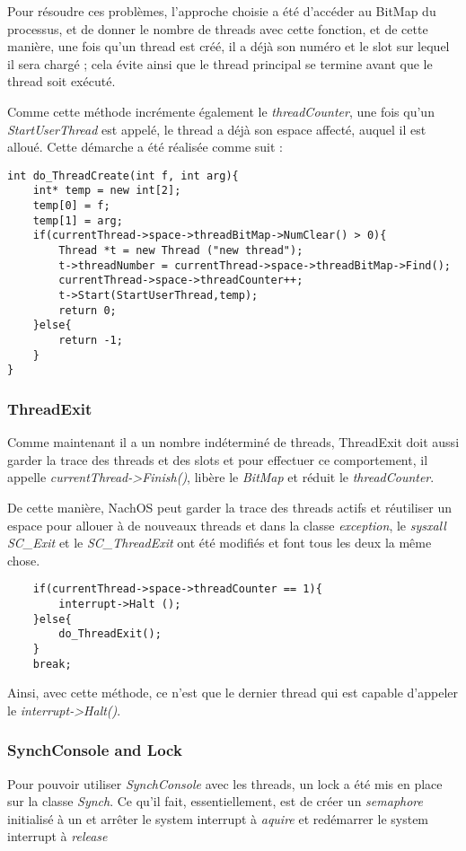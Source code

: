 \documentclass{article}
\begin{document}
Pour résoudre ces problèmes, l'approche choisie a été d'accéder au BitMap du processus, et de donner le nombre de threads avec cette fonction, et de cette manière, une fois qu'un thread est créé, il a déjà son numéro et le slot sur lequel il sera chargé ; cela évite ainsi que le thread principal se termine avant que le thread soit exécuté. 
\newline

Comme cette méthode incrémente également le \textit{threadCounter}, une fois qu'un \textit{StartUserThread} est appelé, le thread a déjà son espace affecté, auquel il est alloué. Cette démarche a été réalisée comme suit : 
\begin{verbatim}
int do_ThreadCreate(int f, int arg){
    int* temp = new int[2];
    temp[0] = f;
    temp[1] = arg;
    if(currentThread->space->threadBitMap->NumClear() > 0){
        Thread *t = new Thread ("new thread");
        t->threadNumber = currentThread->space->threadBitMap->Find();
        currentThread->space->threadCounter++;
        t->Start(StartUserThread,temp);
        return 0;
    }else{
        return -1;
    }
}
\end{verbatim}

\subsubsection{ThreadExit}

Comme maintenant il a un nombre indéterminé de threads, ThreadExit doit aussi garder la trace des threads et des slots et pour effectuer ce comportement, il appelle \textit{currentThread->Finish()}, libère le \textit{BitMap} et réduit le \textit{threadCounter}.

De cette manière, NachOS peut garder la trace des threads actifs et réutiliser un espace pour allouer à de nouveaux threads et dans la classe  \textit{exception}, le  \textit{sysxall SC\_Exit} et le \textit{SC\_ThreadExit} ont été modifiés et font tous les deux la même chose. 
\begin{verbatim}
    if(currentThread->space->threadCounter == 1){
        interrupt->Halt ();
    }else{
        do_ThreadExit();
    }
    break;
\end{verbatim}

Ainsi, avec cette méthode, ce n'est que le dernier thread qui est capable d'appeler le \textit{interrupt->Halt()}.


\subsubsection{SynchConsole and Lock}
Pour pouvoir utiliser \textit{SynchConsole} avec les threads, un lock a été mis en place sur la classe \textit{Synch}. Ce qu'il fait, essentiellement, est de créer un \textit{semaphore} initialisé à un et arrêter le system interrupt à \textit{aquire} et redémarrer le system interrupt à \textit{release}
\end{document}
